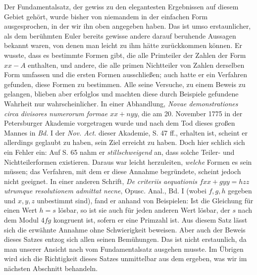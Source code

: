 Der Fundamentalsatz, der gewiss zu den elegantesten Ergebnissen auf diesem Gebiet gehört, wurde bisher von niemandem in der einfachen Form ausgesprochen, in der wir ihn oben angegeben haben. Das ist umso erstaunlicher, als dem berühmten Euler bereits gewisse andere darauf beruhende Aussagen bekannt waren, von denen man leicht zu ihm hätte zurückkommen können. Er wusste, dass es bestimmte Formen gibt, die alle Primteiler der Zahlen der Form $xx-A$ enthalten, und andere, die alle primen Nichtteiler von Zahlen derselben Form umfassen und die ersten Formen ausschließen; auch hatte er ein Verfahren gefunden, diese Formen zu bestimmen. Alle seine Versuche, zu einem Beweis zu gelangen, blieben aber erfolglos und machten diese durch Beispiele gefundene Wahrheit nur wahrscheinlicher. In einer Abhandlung, \textit{Novae demonstrationes circa divisores numerorum formae $xx+nyy$}, die am 20. November 1775 in der Petersburger Akademie vorgetragen wurde und nach dem Tod dieses großen Mannes in \textit{Bd.} I der \textit{Nov. Act.} dieser Akademie, S. 47 ff., erhalten ist, scheint er allerdings geglaubt zu haben, sein Ziel erreicht zu haben. Doch hier schlich sich ein Fehler ein: Auf S. 65 nahm er \textit{stillschweigend} an, dass solche Teiler- und Nichtteilerformen existieren. Daraus war leicht herzuleiten, \textit{welche} Formen es sein müssen; das Verfahren, mit dem er diese Annahme begründete, scheint jedoch nicht geeignet. In einer anderen Schrift, \textit{De criteriis aequationis $fxx+gyy=hzz$ utrumque resolutionem admittat necne}, Opusc. Anal., Bd. I (wobei $f,g,h$ gegeben und $x,y,z$ unbestimmt sind), fand er anhand von Beispielen: Ist die Gleichung für einen Wert $h=s$ lösbar, so ist sie auch für jeden anderen Wert lösbar, der $s$ nach dem Modul $4fg$ kongruent ist, sofern er eine Primzahl ist. Aus diesem Satz lässt sich die erwähnte Annahme ohne Schwierigkeit beweisen. Aber auch der Beweis dieses Satzes entzog sich allen seinen Bemühungen. Das ist nicht erstaunlich, da man unserer Ansicht nach vom Fundamentalsatz ausgehen musste. Im Übrigen wird sich die Richtigkeit dieses Satzes unmittelbar aus dem ergeben, was wir im nächsten Abschnitt behandeln.

